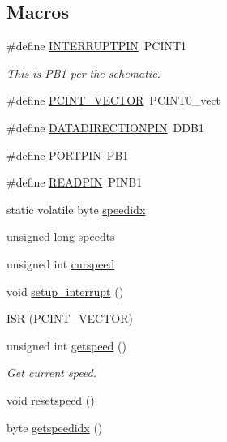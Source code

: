 \subsection*{Macros}
\begin{DoxyCompactItemize}
\item 
\#define \hyperlink{group__speed_ga984097794e94beb18c01b6fcbd8f399d}{I\+N\+T\+E\+R\+R\+U\+P\+T\+P\+IN}~P\+C\+I\+N\+T1
\begin{DoxyCompactList}\small\item\em This is P\+B1 per the schematic. \end{DoxyCompactList}\item 
\#define \hyperlink{group__speed_ga77b45027297b1ff40b5b1249afb852e5}{P\+C\+I\+N\+T\+\_\+\+V\+E\+C\+T\+OR}~P\+C\+I\+N\+T0\+\_\+vect
\item 
\#define \hyperlink{group__speed_ga9142f4c677315955ad0ac6266b615d2c}{D\+A\+T\+A\+D\+I\+R\+E\+C\+T\+I\+O\+N\+P\+IN}~D\+D\+B1
\item 
\#define \hyperlink{group__speed_gaab113cddfa5f8856918dcb65238882ca}{P\+O\+R\+T\+P\+IN}~P\+B1
\item 
\#define \hyperlink{group__speed_ga93a1139e66a97ca289f0f1a73903be06}{R\+E\+A\+D\+P\+IN}~P\+I\+N\+B1
\end{DoxyCompactItemize}
\begin{DoxyCompactItemize}
\item 
static volatile byte \hyperlink{group__speed_gaded4e91dd554c212e6c75ef7148a7845}{speedidx}
\item 
unsigned long \hyperlink{group__speed_ga605bafc427aaa8e9718a112441ba88a7}{speedts}
\item 
unsigned int \hyperlink{group__speed_ga63232e097931bc02aa65b3b7dadbb74b}{curspeed}
\item 
void \hyperlink{group__speed_gae87a94769934715c309733cfdf2abcb4}{setup\+\_\+interrupt} ()
\item 
\hyperlink{group__speed_ga44395845abd4a9c31e4fbe88ed717fa3}{I\+SR} (\hyperlink{group__speed_ga77b45027297b1ff40b5b1249afb852e5}{P\+C\+I\+N\+T\+\_\+\+V\+E\+C\+T\+OR})
\item 
unsigned int \hyperlink{group__speed_gafc7b1718f9b23966dfed24056f67996f}{getspeed} ()
\begin{DoxyCompactList}\small\item\em Get current speed. \end{DoxyCompactList}\item 
void \hyperlink{group__speed_ga2004678343c1f7b145dc10aae949a4ec}{resetspeed} ()
\item 
byte \hyperlink{group__speed_gaa1b4f1cc5cf5ba94e3bc38f44e0c7001}{getspeedidx} ()
\end{DoxyCompactItemize}


